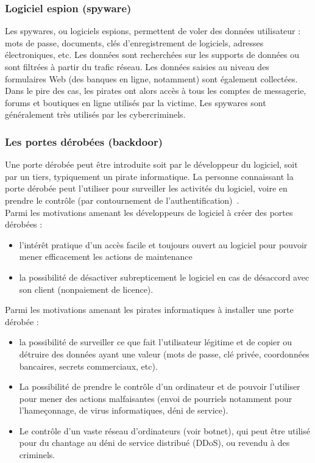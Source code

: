 \subsubsection{Logiciel espion (spyware)}
Les spywares, ou logiciels espions, permettent de voler des données utilisateur : mots de passe, documents, clés d'enregistrement de logiciels, adresses électroniques, etc. Les données sont recherchées sur les supports de données ou sont filtrées à partir du trafic réseau. Les données saisies au niveau des formulaires Web (des banques en ligne, notamment) sont également collectées. Dans le pire des cas, les pirates ont alors accès à tous les comptes de messagerie, forums et boutiques en ligne utilisés par la victime. Les spywares sont généralement très utilisés par les cybercriminels.
\subsubsection{Les portes dérobées (backdoor)}
Une porte dérobée peut être introduite soit par le développeur du logiciel, soit par un tiers,
typiquement un pirate informatique. La personne connaissant la porte dérobée peut l'utiliser pour surveiller les activités du logiciel, voire en prendre le contrôle (par contournement de
l'authentification)~\cite{mal}.\\
Parmi les motivations amenant les développeurs de logiciel à créer des portes dérobées :
\begin{itemize}
\item l'intérêt pratique d'un accès facile et toujours ouvert au logiciel pour pouvoir mener efficacement les actions de maintenance
\item la possibilité de désactiver subrepticement le logiciel en cas de désaccord avec son client (nonpaiement de licence).\\
\end{itemize}
Parmi les motivations amenant les pirates informatiques à installer une porte dérobée :
\begin{itemize}
\item la possibilité de surveiller ce que fait l'utilisateur légitime et de copier ou détruire des données ayant une valeur (mots de passe, clé privée, coordonnées bancaires, secrets commerciaux, etc).
\item La possibilité de prendre le contrôle d'un ordinateur et de pouvoir l'utiliser pour mener des actions malfaisantes (envoi de pourriels notamment pour l'hameçonnage, de virus informatiques, déni de service).
\item Le contrôle d'un vaste réseau d'ordinateurs (voir botnet), qui peut être utilisé pour du chantage au déni de service distribué (DDoS), ou revendu à des criminels.
\end{itemize}
